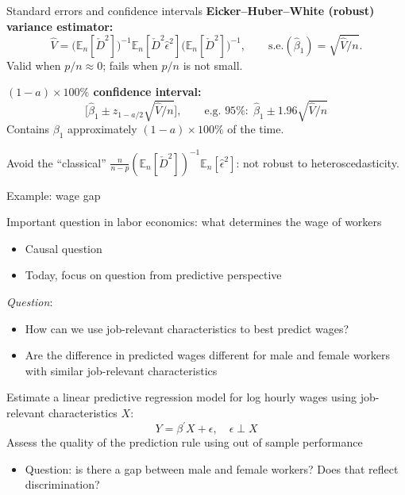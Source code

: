 \documentclass[compress, 8pt]{beamer}
\begin{document}
\begin{frame}{Standard errors and confidence intervals}
    \textbf{Eicker--Huber--White (robust) variance estimator:}
    \begin{equation*}
        \hat{V} = \big(\mathbb{E}_n[\check{D}^2]\big)^{-1}
                  \mathbb{E}_n[\check{D}^2 \hat\epsilon^2]
                  \big(\mathbb{E}_n[\check{D}^2]\big)^{-1},
        \qquad \text{s.e.}(\hat\beta_1) = \sqrt{\hat{V}/n}.
    \end{equation*}
    Valid when $p/n \approx 0$; fails when $p/n$ is not small.
    \medskip

    \textbf{$(1-a)\times 100\%$ confidence interval:}
    \begin{equation*}
        \Big[\hat\beta_1 \pm z_{1-a/2} \sqrt{\hat{V}/n}\Big],
        \qquad \text{e.g. } 95\%: \; \hat\beta_1 \pm 1.96 \sqrt{\hat{V}/n}
    \end{equation*}
    Contains $\beta_1$ approximately $(1-a)\times 100\%$ of the time.
    \medskip

    \footnotesize Avoid the ``classical'' $\frac{n}{n-p}(\mathbb{E}_n[\check{D}^2])^{-1}\mathbb{E}_n[\hat\epsilon^2]$:
    not robust to heteroscedasticity.
\end{frame}
\begin{frame}{Example: wage gap}

    Important question in labor economics: what determines the wage of workers
    \begin{itemize}
        \item Causal question
        \item Today, focus on question from predictive perspective
    \end{itemize}

    \vspace{2ex}
    \emph{Question}:
    \begin{itemize}
        \item How can we use job-relevant characteristics to best predict wages?
        \item Are the difference in predicted wages different for male and female workers with similar job-relevant characteristics
    \end{itemize}

    \vspace{2ex}
    Estimate a linear predictive regression model for log hourly wages using job-relevant characteristics $X$:
    \begin{equation*}
        Y = \beta^\prime X + \epsilon, \quad \epsilon \perp X
    \end{equation*}
    Assess the quality of the prediction rule using out of sample performance
    \begin{itemize}
        \item Question: is there a gap between male and female workers? Does that reflect discrimination?
    \end{itemize}
\end{frame}
\end{document}
